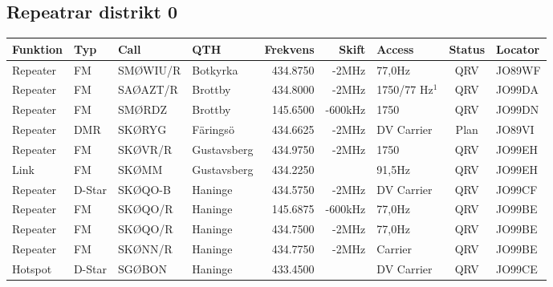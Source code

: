 \begin{landscape}
\subsection{Repeatrar distrikt 0}
\footnotesize
\begin{longtable}{llllrrlcl}
	\textbf{Funktion}  & \textbf{Typ} & \textbf{Call} & \textbf{QTH} & \textbf{Frekvens} & \textbf{Skift} & \textbf{Access} & \textbf{Status} & \textbf{Locator} \\ \hline
	\endhead
	Repeater & FM           & SMØWIU/R      & Botkyrka     &          434.8750 &          -2MHz & 77,0Hz          &       QRV       & JO89WF           \\
	Repeater           & FM           & SAØAZT/R      & Brottby      &          434.8000 &          -2MHz & 1750/77 Hz$^1$  &       QRV       & JO99DA           \\
	Repeater           & FM           & SMØRDZ        & Brottby      &          145.6500 &        -600kHz & 1750            &       QRV       & JO99DN           \\
	Repeater           & DMR          & SKØRYG        & Färingsö     &          434.6625 &          -2MHz & DV Carrier      &      Plan       & JO89VI           \\
	Repeater           & FM           & SKØVR/R       & Gustavsberg  &          434.9750 &          -2MHz & 1750            &       QRV       & JO99EH           \\
	Link               & FM           & SKØMM         & Gustavsberg  &          434.2250 &                & 91,5Hz          &       QRV       & JO99EH           \\
	Repeater           & D-Star       & SKØQO-B       & Haninge      &          434.5750 &          -2MHz & DV Carrier      &       QRV       & JO99CF           \\
	Repeater           & FM           & SKØQO/R       & Haninge      &          145.6875 &        -600kHz & 77,0Hz          &       QRV       & JO99BE           \\
	Repeater           & FM           & SKØQO/R       & Haninge      &          434.7500 &          -2MHz & 77,0Hz          &       QRV       & JO99BE           \\
	Repeater           & FM           & SKØNN/R       & Haninge      &          434.7750 &          -2MHz & Carrier         &       QRV       & JO99BE           \\
	Hotspot            & D-Star       & SGØBON        & Haninge      &          433.4500 &                & DV Carrier      &       QRV       & JO99CE           \\

\end{longtable}
\end{landscape}

